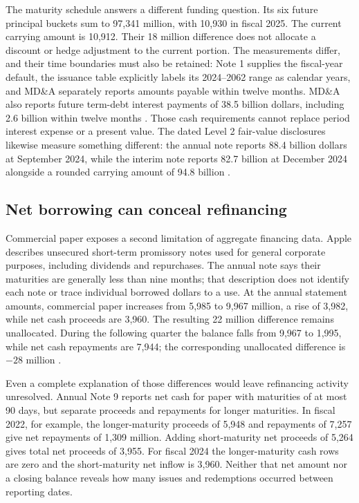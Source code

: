 The maturity schedule answers a different funding question. Its six future
principal buckets sum to 97,341 million, with 10,930 in fiscal 2025. The current
carrying amount is 10,912. Their 18 million difference does not allocate a
discount or hedge adjustment to the current portion. The measurements differ,
and their time boundaries must also be retained: Note 1 supplies the fiscal-year
default, the issuance table explicitly labels its 2024--2062 range as calendar
years, and MD\&A separately reports amounts payable within twelve months.
MD\&A also reports future term-debt interest payments of 38.5 billion dollars,
including 2.6 billion within twelve months \citep[printed pp.~25, 34 and 43]{apple2024}.
Those cash requirements cannot replace period interest expense or a present
value. The dated Level 2 fair-value disclosures likewise measure something
different: the annual note reports 88.4 billion dollars at September 2024,
while the interim note reports 82.7 billion at December 2024 alongside a
rounded carrying amount of 94.8 billion
\citep[Note 6, printed p.~10]{apple2025q1}.

\subsection{Net borrowing can conceal refinancing}

Commercial paper exposes a second limitation of aggregate financing data.
Apple describes unsecured short-term promissory notes used for general
corporate purposes, including dividends and repurchases. The annual note says
their maturities are generally less than nine months; that description does
not identify each note or trace individual borrowed dollars to a use.
At the annual statement amounts, commercial paper increases from 5,985 to
9,967 million, a rise of 3,982, while net cash proceeds are 3,960. The resulting
22 million difference remains unallocated. During the following quarter the
balance falls from 9,967 to 1,995, while net cash repayments are 7,944; the
corresponding unallocated difference is $-28$ million
\citep[Note 9 and balance and cash-flow statements]{apple2024}
\citep[Note 6 and balance and cash-flow statements]{apple2025q1}.

Even a complete explanation of those differences would leave refinancing
activity unresolved. Annual Note 9 reports net cash for paper with maturities
of at most 90 days, but separate proceeds and repayments for longer maturities.
In fiscal 2022, for example, the longer-maturity proceeds of 5,948 and
repayments of 7,257 give net repayments of 1,309 million. Adding short-maturity
net proceeds of 5,264 gives total net proceeds of 3,955. For fiscal 2024 the
longer-maturity cash rows are zero and the short-maturity net inflow is 3,960.
Neither that net amount nor a closing balance reveals how many issues and
redemptions occurred between reporting dates.

